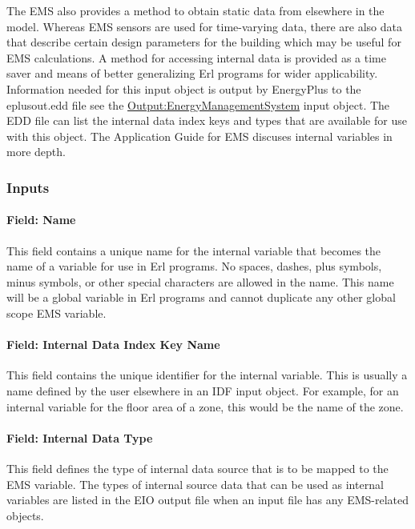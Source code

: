The EMS also provides a method to obtain static data from elsewhere in the model. Whereas EMS sensors are used for time-varying data, there are also data that describe certain design parameters for the building which may be useful for EMS calculations. A method for accessing internal data is provided as a time saver and means of better generalizing Erl programs for wider applicability. Information needed for this input object is output by EnergyPlus to the eplusout.edd file see the \hyperref[outputenergymanagementsystem]{Output:EnergyManagementSystem} input object. The EDD file can list the internal data index keys and types that are available for use with this object. The Application Guide for EMS discuses internal variables in more depth.

\subsubsection{Inputs}\label{inputs-8-006}

\paragraph{Field: Name}\label{field-name-8-005}

This field contains a unique name for the internal variable that becomes the name of a variable for use in Erl programs. No spaces, dashes, plus symbols, minus symbols, or other special characters are allowed in the name. This name will be a global variable in Erl programs and cannot duplicate any other global scope EMS variable.

\paragraph{Field: Internal Data Index Key Name}\label{field-internal-data-index-key-name}

This field contains the unique identifier for the internal variable. This is usually a name defined by the user elsewhere in an IDF input object. For example, for an internal variable for the floor area of a zone, this would be the name of the zone.

\paragraph{Field: Internal Data Type}\label{field-internal-data-type}

This field defines the type of internal data source that is to be mapped to the EMS variable. The types of internal source data that can be used as internal variables are listed in the EIO output file when an input file has any EMS-related objects.

